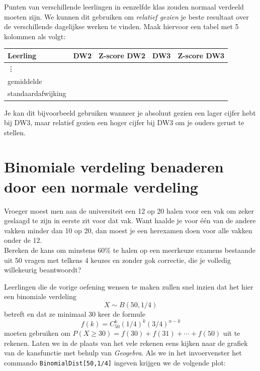 \documentclass[a4paper,12pt, twoside]{article}
\begin{document}
\begin{oefening}
Punten van verschillende leerlingen in eenzelfde klas zouden normaal verdeeld moeten zijn. We kunnen dit gebruiken om {\em relatief gezien} je beste resultaat over de verschillende dagelijkse werken te vinden. Maak hiervoor een tabel met 5 kolommen als volgt:
\begin{center}
  \begin{tabular}{l|c|c|c|c}
  Leerling & DW2 & Z-score DW2 & DW3 & Z-score DW3\\
  \hline
  \vdots&&&&\\
  \hline
  gemiddelde&&&&\\
  standaardafwijking&&&&\\
  \end{tabular}
\end{center}
Je kan dit bijvoorbeeld gebruiken wanneer je absoluut gezien een lager cijfer hebt bij DW3, maar relatief gezien een hoger cijfer bij DW3 om je ouders gerust te stellen.
\end{oefening}

\cleardoublepage
\section{Binomiale verdeling benaderen door een normale verdeling}

\begin{oefening}
Vroeger moest men aan de universiteit een 12 op 20 halen voor een vak om zeker geslaagd te zijn in eerste zit voor dat vak. Want haalde je voor één van de andere vakken minder dan 10 op 20, dan moest je een herexamen doen voor alle vakken onder de 12.\\
Bereken de kans om minstens 60\% te halen op een meerkeuze examens bestaande uit 50 vragen met telkens 4 keuzes en zonder gok correctie, die je volledig willekeurig beantwoordt?
\end{oefening}

Leerlingen die de vorige oefening wensen te maken zullen snel inzien dat het hier een binomiale verdeling
$$X\sim B(50, 1/4)$$
betreft en dat ze minimaal 30 keer de formule
$$f(k)=C_{50}^{k}(1/4)^k(3/4)^{n-k}$$
moeten gebruiken om $P(X\geq 30)=f(30)+f(31)+\cdots +f(50)$ uit te rekenen. Laten we in de plaats van het vele rekenen eens kijken naar de grafiek van de kansfunctie met behulp van {\em Geogebra}. Als we in het invoervenster het commando \verb#BinomialDist[50,1/4]# ingeven krijgen we de volgende plot:
\end{document}

